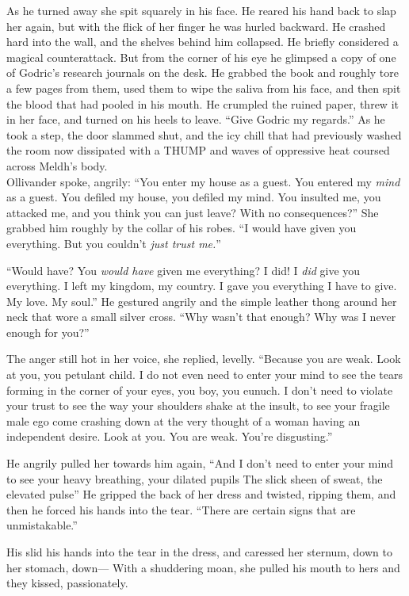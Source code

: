 As he turned away she spit squarely in his face. He reared his hand back to slap her again, but with the flick of her finger he was hurled backward. He crashed hard into the wall, and the shelves behind him collapsed. He briefly considered a magical counterattack. But from the corner of his eye he glimpsed a copy of one of Godric’s research journals on the desk. He grabbed the book and roughly tore a few pages from them, used them to wipe the saliva from his face, and then spit the blood that had pooled in his mouth. He crumpled the ruined paper, threw it in her face, and turned on his heels to leave. “Give Godric my regards.”
\SmallVSpace
As he took a step, the door slammed shut, and the icy chill that had previously washed the room now dissipated with a THUMP and waves of oppressive heat coursed across Meldh’s body.\\Ollivander spoke, angrily: “You enter my house as a guest. You entered my \emph{mind} as a guest. You defiled my house, you defiled my mind. You insulted me, you attacked me, and you think you can just leave? With no consequences?” She grabbed him roughly by the collar of his robes. “I would have given you everything. But you couldn’t \emph{just trust me.}”

“Would have? You \emph{would have} given me everything? I did! I \emph{did} give you everything. I left my kingdom, my country. I gave you everything I have to give. My love. My soul.” He gestured angrily and the simple leather thong around her neck that wore a small silver cross. “Why wasn’t that enough? Why was I never enough for you?”

The anger still hot in her voice, she replied, levelly. “Because you are weak. Look at you, you petulant child. I do not even need to enter your mind to see the tears forming in the corner of your eyes, you boy, you eunuch. I don’t need to violate your trust to see the way your shoulders shake at the insult, to see your fragile male ego come crashing down at the very thought of a woman having an independent desire. Look at you. You are weak. You’re disgusting.”

He angrily pulled her towards him again, “And I don’t need to enter your mind to see your heavy breathing, your dilated pupils{\el} The slick sheen of sweat, the elevated pulse{\el}” He gripped the back of her dress and twisted, ripping them, and then he forced his hands into the tear. “There are certain signs that are unmistakable.”

His slid his hands into the tear in the dress, and caressed her sternum, down to her stomach, down\mbox{---}
\SomeVSpace
With a shuddering moan, she pulled his mouth to hers and they kissed, passionately.
\simpleline

